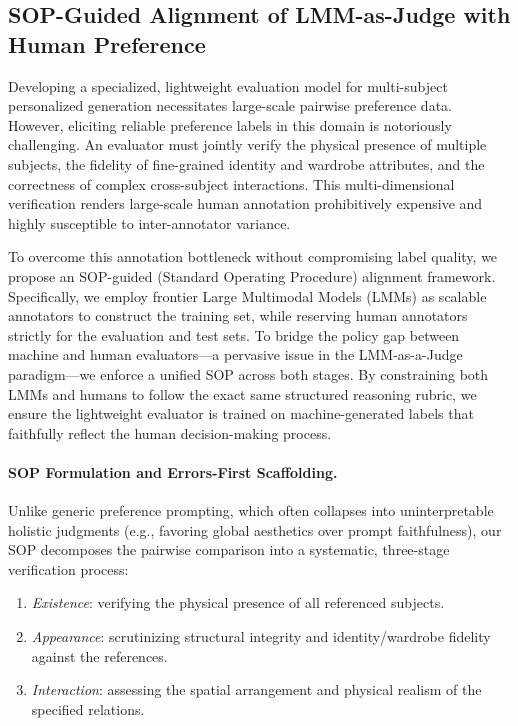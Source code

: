 \subsection{SOP-Guided Alignment of LMM-as-Judge with Human Preference}
\label{sec:method_sop_alignment}

Developing a specialized, lightweight evaluation model for multi-subject personalized generation necessitates large-scale pairwise preference data. However, eliciting reliable preference labels in this domain is notoriously challenging. An evaluator must jointly verify the physical presence of multiple subjects, the fidelity of fine-grained identity and wardrobe attributes, and the correctness of complex cross-subject interactions. This multi-dimensional verification renders large-scale human annotation prohibitively expensive and highly susceptible to inter-annotator variance. 

To overcome this annotation bottleneck without compromising label quality, we propose an SOP-guided (Standard Operating Procedure) alignment framework. Specifically, we employ frontier Large Multimodal Models (LMMs) as scalable annotators to construct the training set, while reserving human annotators strictly for the evaluation and test sets. To bridge the policy gap between machine and human evaluators---a pervasive issue in the LMM-as-a-Judge paradigm---we enforce a unified SOP across both stages. By constraining both LMMs and humans to follow the exact same structured reasoning rubric, we ensure the lightweight evaluator is trained on machine-generated labels that faithfully reflect the human decision-making process.

\paragraph{SOP Formulation and Errors-First Scaffolding.}
Unlike generic preference prompting, which often collapses into uninterpretable holistic judgments (e.g., favoring global aesthetics over prompt faithfulness), our SOP decomposes the pairwise comparison into a systematic, three-stage verification process: 
\begin{enumerate}
    \item \emph{Existence}: verifying the physical presence of all referenced subjects.
    \item \emph{Appearance}: scrutinizing structural integrity and identity/wardrobe fidelity against the references.
    \item \emph{Interaction}: assessing the spatial arrangement and physical realism of the specified relations.
\end{enumerate}

